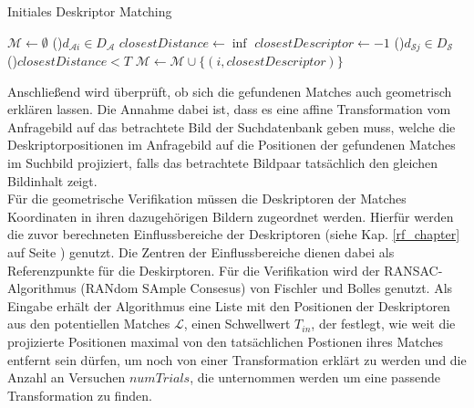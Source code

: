\begin{algorithm}[h]
\caption{Initiales Deskriptor Matching}
\label{descmatch}
\DontPrintSemicolon
{}
$\mathcal{M} \leftarrow \emptyset$ \;
 \ForEach(){$d_{\mathcal{A}i} \in D_\mathcal{A}$}{
	$closestDistance \leftarrow \inf$ \;
	$closestDescriptor \leftarrow -1$ \;
  \ForEach(){$d_{\mathcal{S}j} \in D_\mathcal{S}$}{ 
   }
  \If(){$closestDistance < T$}{
  $\mathcal{M} \leftarrow \mathcal{M}\cup \{(i,closestDescriptor)\}$ 
  }
 }
\end{algorithm}
Anschließend wird überprüft, ob sich die gefundenen Matches auch geometrisch erklären lassen. Die Annahme dabei ist, dass es eine affine Transformation vom Anfragebild auf das betrachtete Bild der Suchdatenbank geben muss, welche die Deskriptorpositionen im Anfragebild auf die Positionen der gefundenen Matches im Suchbild projiziert, falls das betrachtete Bildpaar tatsächlich den gleichen Bildinhalt zeigt.
\\
Für die geometrische Verifikation müssen die Deskriptoren der Matches Koordinaten in ihren dazugehörigen Bildern zugeordnet werden. Hierfür werden die zuvor berechneten Einflussbereiche der Deskriptoren (siehe Kap. \ref{rf_chapter} auf Seite \pageref{rf_chapter}) genutzt. Die Zentren der Einflussbereiche dienen dabei als Referenzpunkte für die Deskirptoren. Für die Verifikation wird der RANSAC-Algorithmus (RANdom SAmple Consesus) \cite{ransac} von Fischler und Bolles genutzt. Als Eingabe erhält der Algorithmus eine Liste mit den Positionen der Deskriptoren aus den potentiellen Matches $\mathcal{L}$, einen Schwellwert $T_{in}$, der festlegt, wie weit die projizierte Positionen maximal von den tatsächlichen Postionen ihres Matches entfernt sein dürfen, um noch von einer Transformation erklärt zu werden und die Anzahl an Versuchen $numTrials$, die unternommen werden um eine passende Transformation zu finden.\\
